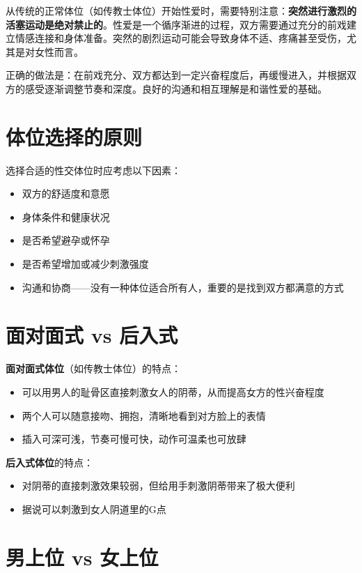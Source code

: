 \documentclass[12pt,UTF8]{ctexbook}
\begin{document}
从传统的正常体位（如传教士体位）开始性爱时，需要特别注意：\textbf{突然进行激烈的活塞运动是绝对禁止的}。性爱是一个循序渐进的过程，双方需要通过充分的前戏建立情感连接和身体准备。突然的剧烈运动可能会导致身体不适、疼痛甚至受伤，尤其是对女性而言。

正确的做法是：在前戏充分、双方都达到一定兴奋程度后，再缓慢进入，并根据双方的感受逐渐调整节奏和深度。良好的沟通和相互理解是和谐性爱的基础。

\vspace{0.5em}
\section{体位选择的原则}

选择合适的性交体位时应考虑以下因素：
\begin{itemize}
	\item 双方的舒适度和意愿
	\item 身体条件和健康状况
	\item 是否希望避孕或怀孕
	\item 是否希望增加或减少刺激强度
	\item 沟通和协商——没有一种体位适合所有人，重要的是找到双方都满意的方式
\end{itemize}

\vspace{0.5em}
\section{面对面式 vs 后入式}

\noindent\textbf{面对面式体位}（如传教士体位）的特点：
\begin{itemize}
	\item 可以用男人的耻骨区直接刺激女人的阴蒂，从而提高女方的性兴奋程度
	\item 两个人可以随意接吻、拥抱，清晰地看到对方脸上的表情
	\item 插入可深可浅，节奏可慢可快，动作可温柔也可放肆
\end{itemize}

\noindent\textbf{后入式体位}的特点：
\begin{itemize}
	\item 对阴蒂的直接刺激效果较弱，但给用手刺激阴蒂带来了极大便利
	\item 据说可以刺激到女人阴道里的G点
\end{itemize}

\vspace{0.5em}
\section{男上位 vs 女上位}
\end{document}
